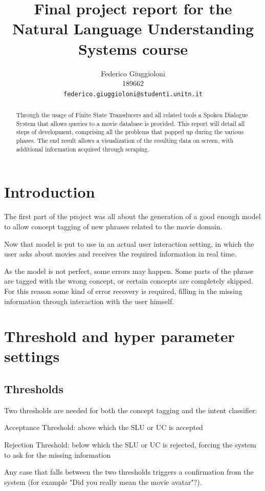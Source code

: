 \documentclass[11pt,a4paper]{article}
\title{Final project report for the Natural Language Understanding Systems course}
\author{Federico Giuggioloni \\
  189662 \\
  {\tt federico.giuggioloni@studenti.unitn.it}}
\date{}
\begin{document}
\maketitle
\begin{abstract}
Through the usage of Finite State Transducers and all related tools a Spoken Dialogue System that allows queries to a movie database is provided. This report will detail all steps of development, comprising all the problems that popped up during the various phases.
The end result allows a visualization of the resulting data on screen, with additional information acquired through scraping.
\end{abstract}

\section{Introduction}
The first part of the project was all about the generation of a good enough model to allow concept tagging of new phrases related to the movie domain. \cite{openfst} \cite{opengrm}

Now that model is put to use in an actual user interaction setting, in which the user asks about movies and receives the required information in real time.

As the model is not perfect, some errors may happen. Some parts of the phrase are tagged with the wrong concept, or certain concepts are completely skipped. For this reason some kind of error recovery is required, filling in the missing information through interaction with the user himself.

\section{Threshold and hyper parameter settings}

\subsection{Thresholds}
Two thresholds are needed for both the concept tagging and the intent classifier:

Acceptance Threshold: above which the SLU or UC is accepted

Rejection Threshold: below which the SLU or UC is rejected, forcing the system to ask for the missing information	

Any case that falls between the two thresholds triggers a confirmation from the system (for example "Did you really mean the movie avatar"?).
\end{document}
